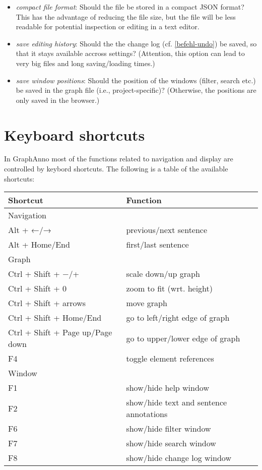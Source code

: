 \documentclass[12pt]{scrartcl}
\begin{document}
\begin{itemize}
	\item	\textit{compact file format}: Should the file be stored in a compact JSON format?
			This has the advantage of reducing the file size, but the file will be less readable for potential inspection or editing in a text editor.
	\item	\textit{save editing history}: Should the the change log (cf. \ref{befehl-undo}) be saved, so that it stays available accross settings?
			(Attention, this option can lead to very big files and long saving/loading times.)
	\item	\textit{save window positions}: Should the position of the windows (filter, search etc.) be saved in the graph file (i.e., project-specific)?
			(Otherwise, the positions are only saved in the browser.)
\end{itemize}



\section{Keyboard shortcuts}

In GraphAnno most of the functions related to navigation and display are controlled by keybord shortcuts.
The following is a table of the available shortcuts:

\begin{center}
	\begin{tabular*}{\textwidth}{ll}
		\toprule
		Shortcut & Function \\
		\midrule
		Navigation & \\
		\midrule
			Alt + ←/→ & previous/next sentence\\
			Alt + Home/End & first/last sentence \\
		\midrule
		Graph & \\
		\midrule
			Ctrl + Shift + −/+ & scale down/up graph\\
			Ctrl + Shift + 0 & zoom to fit (wrt. height) \\
			Ctrl + Shift + arrows & move graph\\
			Ctrl + Shift + Home/End & go to left/right edge of graph\\
			Ctrl + Shift + Page up/Page down& go to upper/lower edge of graph\\
			F4 & toggle element references\\
		\midrule
		Window & \\
		\midrule
			F1 & show/hide help window \\
			F2 & show/hide text and sentence annotations\\
			F6 & show/hide filter window\\
			F7 & show/hide search window\\
			F8 & show/hide change log window\\
		\bottomrule
	\end{tabular*}
\end{center}
\end{document}
